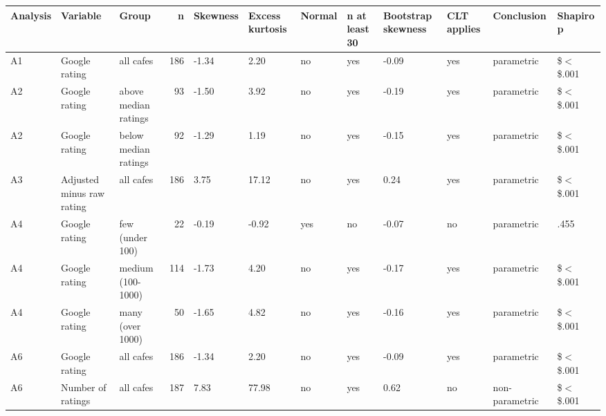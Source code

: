 \begin{table}[ht]
\centering
\begingroup\footnotesize
\begin{tabular}{lllrllllllll}
  \toprule
Analysis & Variable & Group & n & Skewness & Excess kurtosis & Normal & n at least 30 & Bootstrap skewness & CLT applies & Conclusion & Shapiro p \\ 
  \midrule
A1 & Google rating & all cafes & 186 & -1.34 & 2.20 & no & yes & -0.09 & yes & parametric & \$$<$\$.001 \\ 
  A2 & Google rating & above median ratings &  93 & -1.50 & 3.92 & no & yes & -0.19 & yes & parametric & \$$<$\$.001 \\ 
  A2 & Google rating & below median ratings &  92 & -1.29 & 1.19 & no & yes & -0.15 & yes & parametric & \$$<$\$.001 \\ 
  A3 & Adjusted minus raw rating & all cafes & 186 & 3.75 & 17.12 & no & yes & 0.24 & yes & parametric & \$$<$\$.001 \\ 
  A4 & Google rating & few (under 100) &  22 & -0.19 & -0.92 & yes & no & -0.07 & no & parametric & .455 \\ 
  A4 & Google rating & medium (100-1000) & 114 & -1.73 & 4.20 & no & yes & -0.17 & yes & parametric & \$$<$\$.001 \\ 
  A4 & Google rating & many (over 1000) &  50 & -1.65 & 4.82 & no & yes & -0.16 & yes & parametric & \$$<$\$.001 \\ 
  A6 & Google rating & all cafes & 186 & -1.34 & 2.20 & no & yes & -0.09 & yes & parametric & \$$<$\$.001 \\ 
  A6 & Number of ratings & all cafes & 187 & 7.83 & 77.98 & no & yes & 0.62 & no & non-parametric & \$$<$\$.001 \\ 
   \bottomrule
\end{tabular}
\endgroup
\end{table}
